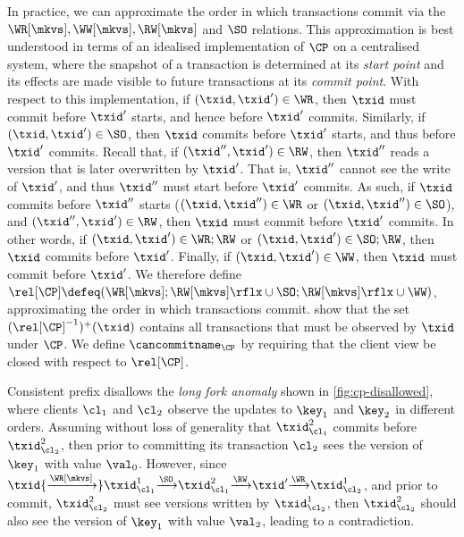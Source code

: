 In practice, we can approximate the order in which transactions 
commit via the \(\WR[\mkvs], \allowbreak \WW[\mkvs], \allowbreak \RW[\mkvs]\) and \(\SO\)  relations. 
This approximation is best understood in terms of an idealised implementation of \(\CP\) on a centralised system,
where the snapshot of a transaction is determined at its \emph{start point} and its effects are made visible to future transactions at its \emph{commit point}.
With respect to this implementation, if \((\txid,\txid') \in \WR\), then 
\(\txid\) must commit before \(\txid'\) starts, and hence before \(\txid'\) commits.
Similarly, if \((\txid,\txid') \in \SO\), then \(\txid\) commits before \(\txid'\) starts, 
and thus before \(\txid'\) commits.
Recall that, if \((\txid'', \txid') \in \RW\),
then \(\txid''\) reads a version that is later overwritten by \(\txid'\).
That is, \(\txid''\) cannot see the write of \(\txid'\), and thus \(\txid''\) must start before 
\(\txid'\) commits. 
As such, if \(\txid\) commits before \(\txid''\) starts 
(\((\txid, \txid'') \in \WR\) or \((\txid,\txid'') \in \SO\)), 
and \((\txid'', \txid') \in \RW\), then \(\txid\) must commit before 
\(\txid'\) commits. 
In other words, if \((\txid,\txid') \in \WR;\RW\) or \((\txid,\txid') \in \SO;\RW\), then \(\txid\) commits before \(\txid'\).
Finally, if \((\txid,\txid') \in\WW\), then \(\txid\) must commit before \(\txid'\). 
We therefore define \(\rel[\CP] \defeq (\WR[\mkvs]; \RW[\mkvs]\rflx \cup \SO;  \RW[\mkvs]\rflx \cup \WW)\), approximating the order in which transactions commit. 
%
\citet{laws} show that the set \((\rel[\CP]^{-1})^{+}(\txid)\) contains all transactions that must be observed by \(\txid\) under \(\CP\). 
We define \(\cancommitname_{\CP}\) by requiring that the client view be 
closed with respect to \(\rel[\CP]\).

Consistent prefix disallows the \emph{long fork anomaly} shown in \cref{fig:cp-disallowed}, where clients \(\cl_1\) and \(\cl_2\) observe the updates to \(\key_1\) and \(\key_2\) 
in different orders. 
Assuming without loss of generality that \( \txid_{\cl_1}^{2} \) commits 
before \( \txid_{\cl_2}^{2} \), then prior to committing its transaction \(\cl_2\) sees 
the version of \(\key_1\) with value \(\val_0\). 
However, since \(\txid {\xrightarrow{\WR[\mkvs]}} \txid_{\cl_{1}}^{1} 
{\xrightarrow{\SO}} \txid_{\cl_{1}}^{2} {\xrightarrow{\RW}} \txid' {\xrightarrow{\WR}} \txid_{\cl_{2}}^{1} \), 
and prior to commit, \( \txid_{\cl_2}^{2} \) must see versions written by \( \txid_{\cl_2}^{1} \),
then \( \txid_{\cl_2}^{2} \) should also see the version of \(\key_1\) with 
value \(\val_2\), leading to a contradiction.


